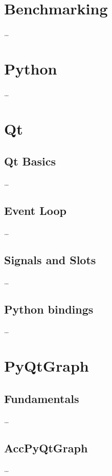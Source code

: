\section{Benchmarking}
\label{sec:fundamentals:benchmarking}

\dots



\section{Python}
\label{sec:fundamentals:benchmarking}

\dots



\section{Qt}
\label{sec:fundamentals:qt}

\subsection{Qt Basics}

\dots

\subsection{Event Loop}

\dots

\subsection{Signals and Slots}

\dots

\subsection{Python bindings}

\dots

\section{PyQtGraph}
\label{sec:fundamentals:pyqtgraph}

\subsection{Fundamentals}

\dots

\subsection{AccPyQtGraph}

\dots

